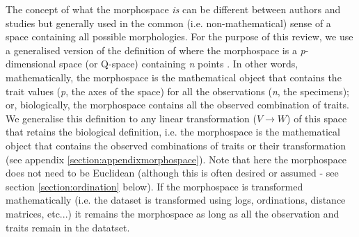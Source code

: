 \documentclass[12pt,letterpaper]{article}
\begin{document}

The concept of what the morphospace \textit{is} can be different between authors and studies but generally used in the common (i.e. non-mathematical) sense of a space containing all possible morphologies.
For the purpose of this review, we use a generalised version of the definition of \cite{mitteroecker2009concept} where the morphospace is a \textit{p}-dimensional space (or Q-space) containing \textit{n} points \citep{mitteroecker2009concept}.
In other words, mathematically, the morphospace is the mathematical object that contains the trait values (\textit{p}, the axes of the space) for all the observations (\textit{n}, the specimens); or, biologically, the morphospace contains all the observed combination of traits.
We generalise this definition to any linear transformation ($V \to W$) of this space that retains the biological definition, i.e. the morphospace is the mathematical object that contains the observed combinations of traits or their transformation (see appendix \ref{section:appendixmorphospace}).
Note that here the morphospace does not need to be Euclidean (although this is often desired or assumed - see section \ref{section:ordination} below).
If the morphospace is transformed mathematically (i.e. the dataset is transformed using logs, ordinations, distance matrices, etc...) it remains the morphospace as long as all the observation and traits remain in the datatset.

\end{document}
